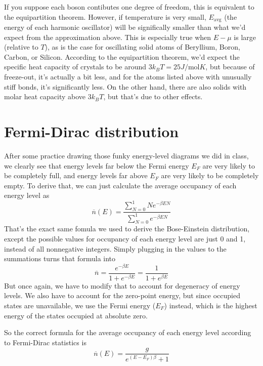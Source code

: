 \documentclass[12pt]{article}
\begin{document}
If you suppose each boson contibutes one degree of freedom, this is equivalent to the equipartition theorem. However, if temperature is very small, $E_\text{avg}$ (the energy of each harmonic oscillator) will be significally smaller than what we'd expect from the approximation above. This is especially true when $E - \mu$ is large (relative to $T$), as is the case for oscillating solid atoms of Beryllium, Boron, Carbon, or Silicon. According to the equipartition theorem, we'd expect the specific heat capacity of crystals to be around $3 k_B T = 25 J / \text{mol} K$, but because of freeze-out, it's actually a bit less, and for the atoms listed above with unusually stiff bonds, it's significantly less. On the other hand, there are also solids with molar heat capacity above $3 k_B T$, but that's due to other effects.

\section{Fermi-Dirac distribution}
After some practice drawing those funky energy-level diagrams we did in class, we clearly see that energy levels far below the Fermi energy $E_F$ are very likely to be completely full, and energy levels far above $E_F$ are very likely to be completely empty. To derive that, we can just calculate the average occupancy of each energy level as
\[\overline{n}(E) = \frac{\sum\limits_{N=0}^1 N e^{- \beta E N}}{\sum\limits_{N=0}^1 e^{- \beta E N}}\]
That's the exact same fomula we used to derive the Bose-Einstein distribution, except the possible values for occupancy of each energy level are just 0 and 1, instead of all nonnegative integers. Simply plugging in the values to the summations turns that formula into
\[\overline{n} = \frac{e^{- \beta E}}{1 + e^{- \beta E}} = \frac{1}{1 + e^{\beta E}} \]
But once again, we have to modify that to account for degeneracy of energy levels. We also have to account for the zero-point energy, but since occupied states are unavailable, we use the Fermi energy ($E_F$) instead, which is the highest energy of the states occupied at absolute zero.

So the correct formula for the average occupancy of each energy level according to Fermi-Dirac statistics is
\[\overline{n}(E) = \frac{g}{e^{(E - E_F) \beta} + 1} \]
\end{document}
